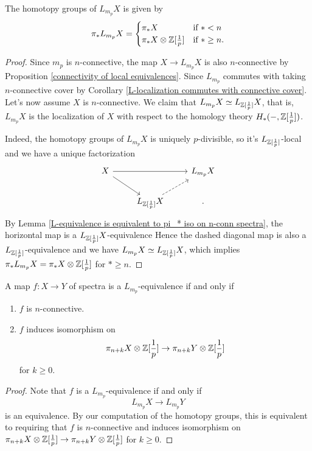\begin{corollary}
	The homotopy groups of $L_{m_p}X$ is given by
	\[
	\pi_* L_{m_p}X = \begin{cases}
		\pi_*X & \text{if $*< n$}\\
		\pi_*X\otimes {\mathbb{Z}}[\frac{1}{p}] & \text{if $*\geq n$}.
	\end{cases}
	\]
\end{corollary}
\begin{proof}
	Since $m_p$ is $n$-connective, the map $X \to L_{m_p}X$ is also $n$-connective by Proposition \ref{connectivity of local equivalences}. Since $L_{m_p}$ commutes with taking $n$-connective cover by Corollary \ref{L-localization commutes with connective cover}.
	 Let's now assume $X$ is $n$-connective. We claim that $L_{m_p}X\simeq L_{{\mathbb{Z}}[\frac{1}{p}]}X$, that is, $L_{m_p}X$ is the localization of $X$ with respect to the homology theory $H_{*}(-,{\mathbb{Z}}[\frac{1}{p}])$.
	
	Indeed, the homotopy groups of $L_{m_{p}}X$ is uniquely $p$-divisible, so it's $L_{{\mathbb{Z}}[\frac{1}{p}]}$-local and we have a unique factorization
	\[
	\begin{tikzcd}
		X &   & L_{m_p}X\\
		  & L_{\BZ[\frac{1}{p}]}X &
	\arrow[from=1-1, to=1-3]
	\arrow[from=1-1, to=2-2]
	\arrow[from=2-2, to=1-3, dashed].
	\end{tikzcd}
	\]
By Lemma \ref{L-equivalence is equivalent to pi_* iso on n-conn spectra}, the horizontal map is a  $L_{{\mathbb{Z}}[\frac{1}{p}]}X$-equivalence
	Hence the dashed diagonal map is also a $L_{{\mathbb{Z}}[\frac{1}{p}]}$-equivalence and we have $L_{m_p}X\simeq L_{{\mathbb{Z}}[\frac{1}{p}]}X$, which implies $\pi_*L_{m_p}X=\pi_*X\otimes {\mathbb{Z}}[\frac{1}{p}]$ for $*\geq n$.
\end{proof}

\begin{lemma}
	A map $f:X \to Y$ of spectra is a $L_{m_p}$-equivalence if and only if 
	\begin{enumerate}
	 	\item $f$ is $n$-connective.
		\item $f$ induces isomorphism on 
	$$
	\pi_{n+k}X\otimes {\mathbb{Z}}[\frac{1}{p}]\to \pi_{n+k}Y\otimes {\mathbb{Z}}[\frac{1}{p}]
	$$
	for $k\geq 0$.

	\end{enumerate}
	\end{lemma}
\begin{proof}
Note that $f$ is a $L_{m_p}$-equivalence if and only if  
$$
L_{m_p}X \to L_{m_p}Y
$$
is an equivalence. By our computation of the homotopy groups, this is equivalent to requiring that $f$ is $n$-connective and induces isomorphism on 
	$
	\pi_{n+k}X\otimes {\mathbb{Z}}[\frac{1}{p}]\to \pi_{n+k}Y\otimes {\mathbb{Z}}[\frac{1}{p}]
	$
	for $k\geq 0$.



\end{proof}

